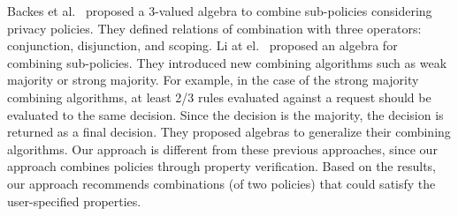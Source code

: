 {%
Backes et al.~\cite{backes04algebra} proposed a 3-valued algebra to combine sub-policies considering privacy policies. They defined relations of combination with three operators: conjunction, disjunction, and scoping. Li at el.~\cite{Ninghui2009} proposed an algebra for combining sub-policies. They introduced new combining algorithms such as weak majority or strong majority. For example, in the case of the strong majority combining algorithms, at least 2/3 rules evaluated against a request should be evaluated to the same decision. Since the decision is the majority, the decision is returned as a final decision. They proposed algebras to generalize their combining algorithms.
Our approach is different from these previous approaches, since
our approach combines policies through property verification.
Based on the results, our approach recommends combinations (of two policies) that could satisfy the user-specified properties.
}







